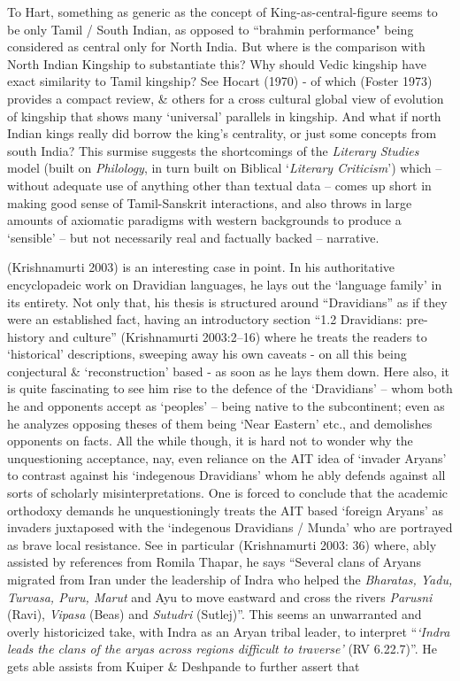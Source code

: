 To Hart, something as generic as the concept of King-as-central-figure seems to be only Tamil / South Indian, as opposed to “brahmin performance" being considered as central only for North India. But where is the comparison with North Indian Kingship to substantiate this? Why should Vedic kingship have exact similarity to Tamil kingship? See Hocart (1970) - of which (Foster 1973) provides a compact review, \& others for a cross cultural global view of evolution of kingship that shows many ‘universal’ parallels in kingship. And what if north Indian kings really did borrow the king’s centrality, or just some concepts from south India? This surmise suggests the shortcomings of the \textit{Literary Studies} model (built on \textit{Philology}, in turn built on Biblical ‘\textit{Literary Criticism}’) which – without adequate use of anything other than textual data – comes up short in making good sense of Tamil-Sanskrit interactions, and also throws in large amounts of axiomatic paradigms with western backgrounds to produce a ‘sensible’ – but not necessarily real and factually backed – narrative.

(Krishnamurti 2003) is an interesting case in point. In his authoritative encyclopadeic work on Dravidian languages, he lays out the ‘language family’ in its entirety. Not only that, his thesis is structured around “Dravidians” as if they were an established fact, having an introductory section “1.2 Dravidians: pre-history and culture” (Krishnamurti 2003:2–16) where he treats the readers to ‘historical’ descriptions, sweeping away his own caveats - on all this being conjectural \& ‘reconstruction’ based - as soon as he lays them down. Here also, it is quite fascinating to see him rise to the defence of the ‘Dravidians’ – whom both he and opponents accept as ‘peoples’ – being native to the subcontinent; even as he analyzes opposing theses of them being ‘Near Eastern’ etc., and demolishes opponents on facts. All the while though, it is hard not to wonder why the unquestioning acceptance, nay, even reliance on the AIT idea of ‘invader Aryans’ to contrast against his ‘indegenous Dravidians’ whom he ably defends against all sorts of scholarly misinterpretations. One is forced to conclude that the academic orthodoxy demands he unquestioningly treats the AIT based ‘foreign Aryans’ as invaders juxtaposed with the ‘indegenous Dravidians / Munda’ who are portrayed as brave local resistance. See in particular (Krishnamurti 2003: 36) where, ably assisted by references from Romila Thapar, he says “Several clans of Aryans migrated from Iran under the leadership of Indra who helped the \textit{Bharatas, Yadu, Turvasa, Puru, Marut} and Ayu to move eastward and cross the rivers \textit{Parusni} (Ravi), \textit{Vipasa} (Beas) and \textit{Sutudri} (Sutlej)”. This seems an unwarranted and overly historicized take, with Indra as an Aryan tribal leader, to interpret “\textit{‘Indra leads the clans of the aryas across regions difficult to traverse’} (RV 6.22.7)”. He gets able assists from Kuiper \& Deshpande to further assert that

